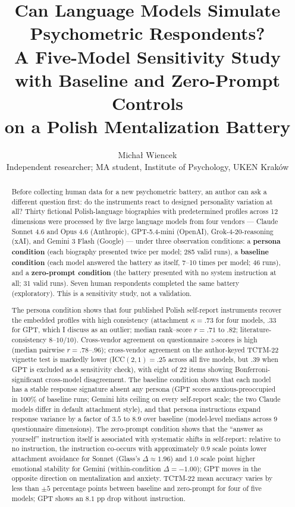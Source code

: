 \documentclass[11pt,a4paper]{article}
\title{\textbf{Can Language Models Simulate Psychometric Respondents?\\[4pt]
A Five-Model Sensitivity Study with Baseline and Zero-Prompt Controls\\on a Polish Mentalization Battery}}
\author{Micha{\l} Wiencek\\\small Independent researcher; MA student, Institute of Psychology, UKEN Krak\'ow}
\date{}
\begin{document}
\maketitle

\begin{abstract}
\noindent Before collecting human data for a new psychometric battery, an author can ask a different question first: do the instruments react to designed personality variation at all? Thirty fictional Polish-language biographies with predetermined profiles across 12 dimensions were processed by five large language models from four vendors --- Claude Sonnet 4.6 and Opus 4.6 (Anthropic), GPT-5.4-mini (OpenAI), Grok-4-20-reasoning (xAI), and Gemini 3 Flash (Google) --- under three observation conditions: a \textbf{persona condition} (each biography presented twice per model; 285 valid runs), a \textbf{baseline condition} (each model answered the battery as itself, 7--10 times per model; 46 runs), and a \textbf{zero-prompt condition} (the battery presented with no system instruction at all; 31 valid runs). Seven human respondents completed the same battery (exploratory). This is a sensitivity study, not a validation.

The persona condition shows that four published Polish self-report instruments recover the embedded profiles with high consistency (attachment $\kappa = .73$ for four models, $.33$ for GPT, which I discuss as an outlier; median rank--score $r = .71$ to $.82$; literature-consistency $8$--$10$/$10$). Cross-vendor agreement on questionnaire $z$-scores is high (median pairwise $r = .78$--$.96$); cross-vendor agreement on the author-keyed TCTM-22 vignette test is markedly lower (ICC$(2,1) = .25$ across all five models, but $.39$ when GPT is excluded as a sensitivity check), with eight of 22 items showing Bonferroni-significant cross-model disagreement. The baseline condition shows that each model has a stable response signature absent any persona (GPT scores anxious-preoccupied in 100\% of baseline runs; Gemini hits ceiling on every self-report scale; the two Claude models differ in default attachment style), and that persona instructions expand response variance by a factor of $3.5$ to $8.9$ over baseline (model-level medians across 9 questionnaire dimensions). The zero-prompt condition shows that the ``answer as yourself'' instruction itself is associated with systematic shifts in self-report: relative to no instruction, the instruction co-occurs with approximately $0.9$ scale points lower attachment avoidance for Sonnet (Glass's $\Delta \approx 1.96$) and $1.0$ scale point higher emotional stability for Gemini (within-condition $\Delta = -1.00$); GPT moves in the opposite direction on mentalization and anxiety. TCTM-22 mean accuracy varies by less than $\pm 5$ percentage points between baseline and zero-prompt for four of five models; GPT shows an $8.1$ pp drop without instruction.


\end{abstract}
\end{document}
